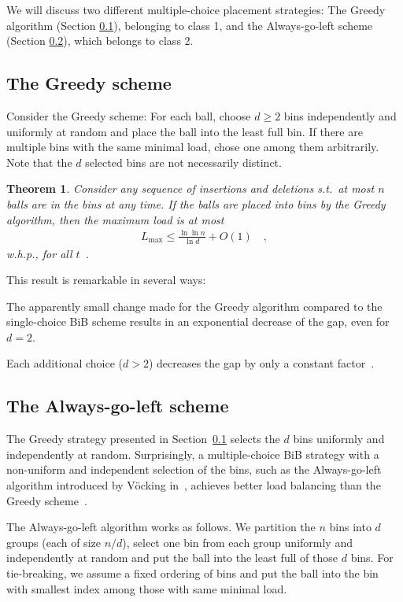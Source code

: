 \documentclass[a4paper,12pt]{article}
\newcommand\load{L_{\mathrm{max}}}
\newtheorem{theorem}{Theorem}
\begin{document}
We will discuss two different multiple-choice placement strategies: The Greedy algorithm (Section \ref{sec:greedy}), belonging to class 1, and the Always-go-left scheme (Section \ref{sec:AlwaysGoLeft}), which belongs to class 2.

\subsection{The Greedy scheme}
\label{sec:greedy}
Consider the Greedy scheme: For each ball, choose $d \geq 2$ bins independently and uniformly at random and place the ball into the least full bin. If there are multiple bins with the same minimal load, chose one among them arbitrarily. Note that the $d$ selected bins are not necessarily distinct. 

\begin{theorem}
\label{theorem:greedy}
Consider any sequence of insertions and deletions s.t.~at most $n$ balls are in the bins at any time. If the balls are placed into bins by the Greedy algorithm, then the maximum load is at most
\begin{align*}
\load \leq \frac{\ln \ln n}{\ln d}+ O(1) \quad ,
\end{align*}
w.h.p., for all $t$~\cite{ABKU99, BCSV06}.
\end{theorem}
This result is remarkable in several ways:
\begin{compactitem}
\item The apparently small change made for the Greedy algorithm compared to the single-choice BiB scheme results in an exponential decrease of the gap, even for $d=2$. 
\item Each additional choice ($d > 2$) decreases the gap by only a constant factor~\cite{MRS01}.
\end{compactitem}

\subsection{The Always-go-left scheme}
\label{sec:AlwaysGoLeft}
The Greedy strategy presented in Section~\ref{sec:greedy} selects the $d$ bins uniformly and independently at random. Surprisingly, a multiple-choice BiB strategy with a non-uniform and independent selection of the bins, such as the Always-go-left algorithm introduced by V\"ocking in~\cite{VOC03}, achieves better load balancing than the Greedy scheme~\cite{BCSV06}.

The Always-go-left algorithm works as follows. We partition the $n$ bins into $d$ groups (each of size $n/d$), select one bin from each group uniformly and independently at random and put the ball into the least full of those $d$ bins. For tie-breaking, we assume a fixed ordering of bins and put the ball into the bin with smallest index among those with same minimal load.
\end{document}

